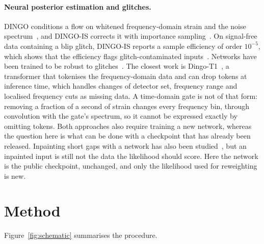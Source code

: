 \documentclass{openjournal}
\begin{document}
\paragraph{Neural posterior estimation and glitches.}
DINGO conditions a flow on whitened frequency-domain strain and the noise spectrum~\cite{Dax2021dingo,Dax2022gnpe,Wildberger2023psd}, and DINGO-IS corrects it with importance sampling~\cite{Dax2023is}.
On signal-free data containing a blip glitch, DINGO-IS reports a sample efficiency of order $10^{-5}$, which shows that the efficiency flags glitch-contaminated inputs~\cite{Dax2023is}.
Networks have been trained to be robust to glitches~\cite{Sun2024ttsf,Xiong2025robust}.
The closest work is Dingo-T1~\cite{Kofler2025transformer}, a transformer that tokenises the frequency-domain data and can drop tokens at inference time, which handles changes of detector set, frequency range and localised frequency cuts as missing data.
A time-domain gate is not of that form: removing a fraction of a second of strain changes every frequency bin, through convolution with the gate's spectrum, so it cannot be expressed exactly by omitting tokens.
Both approaches also require training a new network, whereas the question here is what can be done with a checkpoint that has already been released.
Inpainting short gaps with a network has also been studied~\cite{Kumar2026inpaint}, but an inpainted input is still not the data the likelihood should score.
Here the network is the public checkpoint, unchanged, and only the likelihood used for reweighting is new.

\section{Method}
\label{sec:method}

Figure~\ref{fig:schematic} summarises the procedure.
\end{document}
